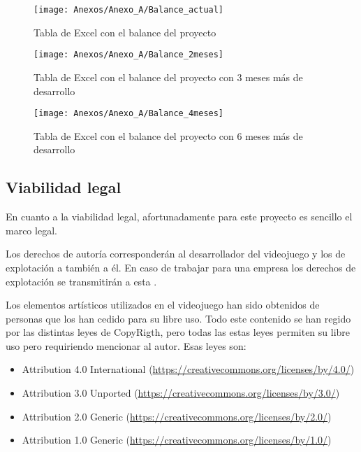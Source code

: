 \begin{figure}[h]
\centering
\texttt{[image: Anexos/Anexo\_A/Balance\_actual]}
\caption{Tabla de Excel con el balance del proyecto}
\end{figure}

\begin{figure}[h]
\centering
\texttt{[image: Anexos/Anexo\_A/Balance\_2meses]}
\caption{Tabla de Excel con el balance del proyecto con 3 meses más de desarrollo}
\end{figure}

\begin{figure}[h]
\centering
\texttt{[image: Anexos/Anexo\_A/Balance\_4meses]}
\caption{Tabla de Excel con el balance del proyecto con 6 meses más de desarrollo}
\end{figure}
\clearpage

\subsection{Viabilidad legal}
En cuanto a la viabilidad legal, afortunadamente para este proyecto es sencillo el marco legal.

Los derechos de autoría corresponderán al desarrollador del videojuego y los de explotación a también a él. En caso de trabajar para una empresa los derechos de explotación se transmitirán a esta \cite{PropiedadIntelectual}.

Los elementos artísticos utilizados en el videojuego han sido obtenidos de personas que los han cedido para su libre uso. Todo este contenido se han regido por las distintas leyes de CopyRigth, pero todas las estas leyes permiten su libre uso pero requiriendo mencionar al autor. Esas leyes son:
\begin{itemize}
\item
Attribution 4.0 International (\url{https://creativecommons.org/licenses/by/4.0/})
\item
Attribution 3.0 Unported (\url{https://creativecommons.org/licenses/by/3.0/})
\item
Attribution 2.0 Generic (\url{https://creativecommons.org/licenses/by/2.0/})
\item
Attribution 1.0 Generic (\url{https://creativecommons.org/licenses/by/1.0/})
\end{itemize}